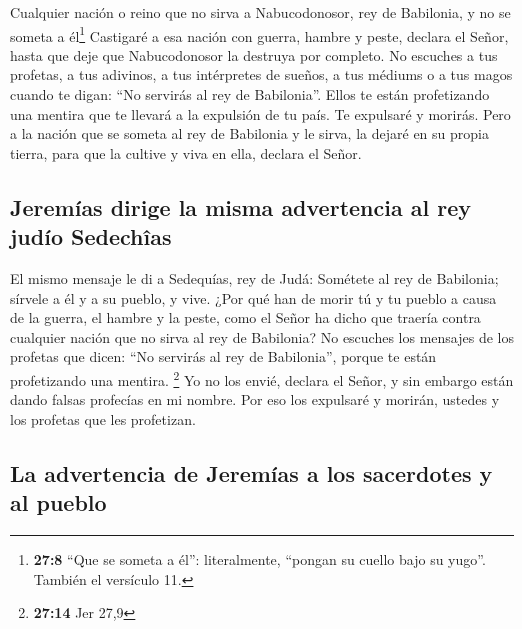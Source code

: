  Cualquier nación o reino que no sirva a Nabucodonosor,
rey de Babilonia, y no se someta a él\footnote{\textbf{27:8} ``Que se
  someta a él'': literalmente, ``pongan su cuello bajo su yugo''.
  También el versículo 11.} Castigaré a esa nación con guerra, hambre y
peste, declara el Señor, hasta que deje que Nabucodonosor la destruya
por completo.  No escuches a tus profetas, a tus adivinos,
a tus intérpretes de sueños, a tus médiums o a tus magos cuando te
digan: ``No servirás al rey de Babilonia''.  Ellos te
están profetizando una mentira que te llevará a la expulsión de tu país.
Te expulsaré y morirás.  Pero a la nación que se someta
al rey de Babilonia y le sirva, la dejaré en su propia tierra, para que
la cultive y viva en ella, declara el Señor.

\hypertarget{jeremuxedas-dirige-la-misma-advertencia-al-rey-juduxedo-sedechuxeeas}{%
\subsection{Jeremías dirige la misma advertencia al rey judío
Sedechîas}\label{jeremuxedas-dirige-la-misma-advertencia-al-rey-juduxedo-sedechuxeeas}}

 El mismo mensaje le di a Sedequías, rey de Judá:
Sométete al rey de Babilonia; sírvele a él y a su pueblo, y vive.
 ¿Por qué han de morir tú y tu pueblo a causa de la
guerra, el hambre y la peste, como el Señor ha dicho que traería contra
cualquier nación que no sirva al rey de Babilonia?  No
escuches los mensajes de los profetas que dicen: ``No servirás al rey de
Babilonia'', porque te están profetizando una mentira. \footnote{\textbf{27:14}
  Jer 27,9}  Yo no los envié, declara el Señor, y sin
embargo están dando falsas profecías en mi nombre. Por eso los expulsaré
y morirán, ustedes y los profetas que les profetizan.

\hypertarget{la-advertencia-de-jeremuxedas-a-los-sacerdotes-y-al-pueblo}{%
\subsection{La advertencia de Jeremías a los sacerdotes y al
pueblo}\label{la-advertencia-de-jeremuxedas-a-los-sacerdotes-y-al-pueblo}}

